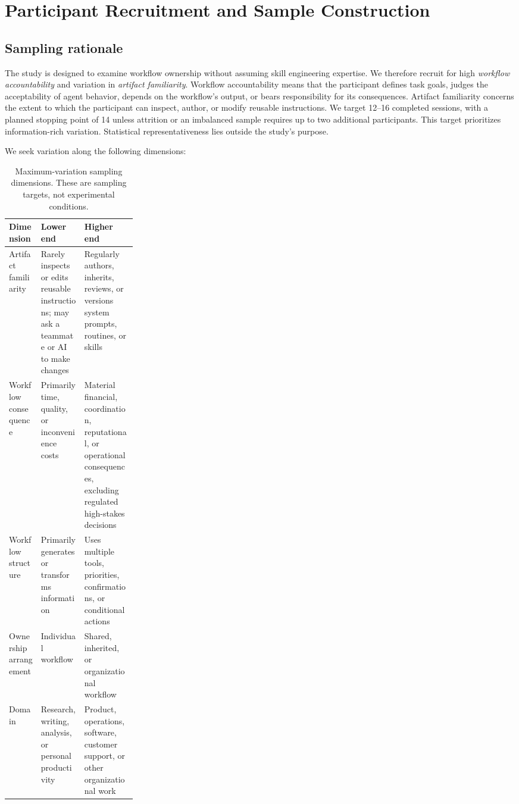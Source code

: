 
\section{Participant Recruitment and Sample Construction}
\label{app:participants}

\subsection{Sampling rationale}

The study is designed to examine workflow ownership without assuming skill
engineering expertise. We therefore recruit for high \emph{workflow
accountability} and variation in \emph{artifact familiarity}. Workflow
accountability means that the participant defines task goals, judges the
acceptability of agent behavior, depends on the workflow's output, or bears
responsibility for its consequences. Artifact familiarity concerns the extent
to which the participant can inspect, author, or modify reusable instructions.
We target 12--16 completed sessions, with a planned stopping point of 14 unless
attrition or an imbalanced sample requires up to two additional participants.
This target prioritizes information-rich variation. Statistical
representativeness lies outside the study's purpose.

We seek variation along the following dimensions:

\begin{table}[h]
\centering
\caption{Maximum-variation sampling dimensions. These are sampling targets,
not experimental conditions.}
\label{tab:sampling-dimensions}
\begin{tabularx}{\linewidth}{P{0.25\linewidth}YY}
\toprule
\textbf{Dimension} & \textbf{Lower end} & \textbf{Higher end} \\
\midrule
Artifact familiarity & Rarely inspects or edits reusable instructions; may ask a teammate or AI to make changes & Regularly authors, inherits, reviews, or versions system prompts, routines, or skills \\
Workflow consequence & Primarily time, quality, or inconvenience costs & Material financial, coordination, reputational, or operational consequences, excluding regulated high-stakes decisions \\
Workflow structure & Primarily generates or transforms information & Uses multiple tools, priorities, confirmations, or conditional actions \\
Ownership arrangement & Individual workflow & Shared, inherited, or organizational workflow \\
Domain & Research, writing, analysis, or personal productivity & Product, operations, software, customer support, or other organizational work \\
\bottomrule
\end{tabularx}
\end{table}

